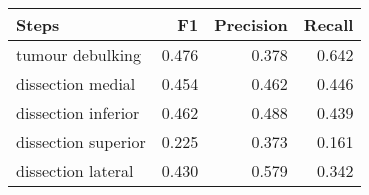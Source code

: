 \begin{tabular}{lrrr}
\toprule
Steps & F1 & Precision & Recall \\
\midrule
tumour debulking & 0.476 & 0.378 & 0.642 \\
dissection medial & 0.454 & 0.462 & 0.446 \\
dissection inferior & 0.462 & 0.488 & 0.439 \\
dissection superior & 0.225 & 0.373 & 0.161 \\
dissection lateral & 0.430 & 0.579 & 0.342 \\
\bottomrule
\end{tabular}
